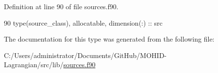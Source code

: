 Definition at line 90 of file sources.\+f90.


\begin{DoxyCode}
90         \textcolor{keywordtype}{type}(source\_class), \textcolor{keywordtype}{allocatable}, \textcolor{keywordtype}{dimension(:)} :: src
\end{DoxyCode}


The documentation for this type was generated from the following file\+:\begin{DoxyCompactItemize}
\item 
C\+:/\+Users/administrator/\+Documents/\+Git\+Hub/\+M\+O\+H\+I\+D-\/\+Lagrangian/src/lib/\mbox{\hyperlink{sources_8f90}{sources.\+f90}}\end{DoxyCompactItemize}
